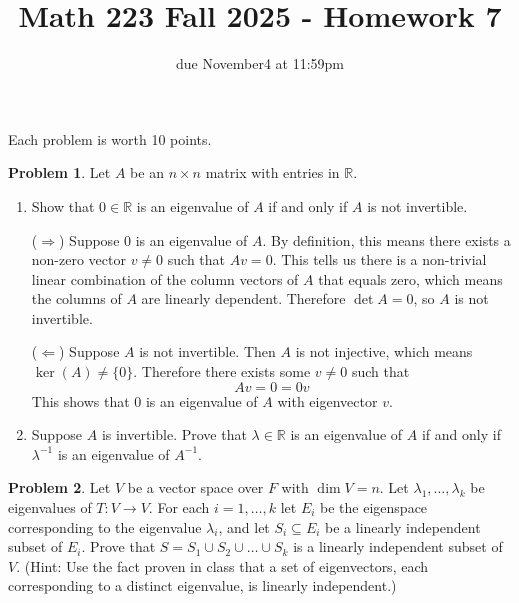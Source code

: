 \documentclass[12pt, oneside]{amsart}
\title{Math 223 Fall 2025 - Homework 7}
\author{due November4 at 11:59pm}
\theoremstyle{definition}
\newtheorem{prob}{Problem}
\begin{document}
\maketitle
Each problem is worth 10 points.


\begin{prob} Let $A$ be an $n\times n$ matrix with entries in $\mathbb R$.
    \begin{enumerate}
        \item Show that $0\in \mathbb R$ is an eigenvalue of $A$ if and only if $A$ is not invertible.
        
        \begin{solution}
        
        ($\Rightarrow$) Suppose $0$ is an eigenvalue of $A$. By definition, this means there exists a non-zero vector $v \neq 0$ such that $Av = 0$. This tells us there is a non-trivial linear combination of the column vectors of $A$ that equals zero, which means the columns of $A$ are linearly dependent. Therefore $\det A = 0$, so $A$ is not invertible.
        
        ($\Leftarrow$) Suppose $A$ is not invertible. Then $A$ is not injective, which means $\ker(A) \neq \{0\}$. Therefore there exists some $v \neq 0$ such that
        \[
        Av = 0 = 0v
        \]
        This shows that $0$ is an eigenvalue of $A$ with eigenvector $v$.

        \end{solution}
        
        \item Suppose $A$ is invertible. Prove that $\lambda\in \mathbb R$ is an eigenvalue of $A$ if and only if $\lambda^{-1}$ is an eigenvalue of $A^{-1}$.
    \end{enumerate}
\end{prob}

\begin{prob} Let $V$ be a vector space over $F$ with $\dim V = n$.
Let $\lambda_1, \dots, \lambda_k$ be eigenvalues of $T:V\to V$. For each $i=1, \dots, k$ let $E_i$ be the eigenspace corresponding to the eigenvalue $\lambda_i$, and let $S_i\subseteq E_i$ be a linearly independent subset of $E_i$. Prove that $S = S_1\cup S_2\cup \dots \cup S_k$ is a linearly independent subset of $V$.
(Hint: Use the fact proven in class that a set of eigenvectors, each corresponding to a distinct eigenvalue, is linearly independent.)
\end{prob}
\end{document}
